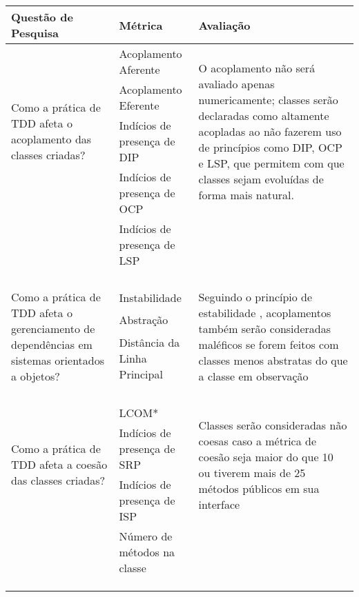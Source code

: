 \begin{table}
	\begin{tabular}{ | p{5cm} | p{5cm} | p{5cm} | }
		\hline
		Questão de Pesquisa & Métrica & Avaliação \\
		
		\hline
		
		\multirow{4}{5cm}{Como a prática de TDD afeta o acoplamento das classes criadas?} 
		& Acoplamento Aferente & \multirow{4}{5cm}{O acoplamento não será avaliado
		apenas numericamente; classes serão declaradas como altamente acopladas ao
		não fazerem uso de princípios como DIP, OCP e LSP, que permitem com que
		classes sejam evoluídas de forma mais natural.} \\ & Acoplamento Eferente
		& \\ & Indícios de presença de DIP & \\ & Indícios de presença de OCP & \\
		& Indícios de presença de LSP & \\
		& & \\ & & \\ & & \\ & & \\
		\hline
		
		\multirow{3}{5cm}{Como a prática de TDD afeta o gerenciamento de dependências em sistemas
		orientados a objetos?} 
		& Instabilidade & 
		\multirow{3}{5cm}{Seguindo o princípio de estabilidade \cite{bob-martin},
		acoplamentos também serão consideradas maléficos se forem feitos com classes menos abstratas 
		do que a classe em observação} \\ 
		& Abstração & \\ 
		& Distância da Linha Principal & \\
		& & \\ & & \\ & & \\ & & \\

		\hline
		
		\multirow{3}{5cm}{Como a prática de TDD afeta a coesão das classes criadas?} 
		& LCOM* & 
		\multirow{3}{5cm}{Classes serão consideradas não coesas caso a métrica de
		coesão seja maior do que 10 ou tiverem mais de 25 métodos
		públicos em sua interface} \\ 
		& Indícios de presença de SRP & \\ 
		& Indícios de presença de ISP & \\
		& Número de métodos na classe & \\
		& & \\ & & \\ & & \\
		\hline
		

\end{tabular}
\end{table}
